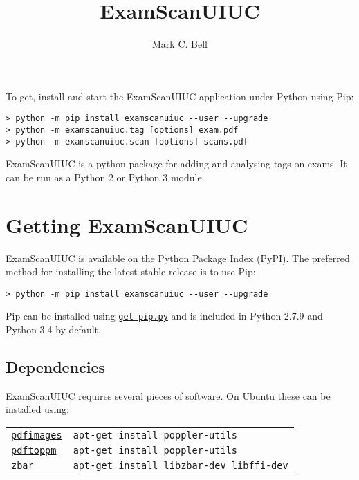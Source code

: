 \documentclass[a4paper]{article}
\title{ExamScanUIUC}
\author{Mark C. Bell}
\begin{document}
\maketitle

\begin{center}
\begin{minipage}{0.9\linewidth}
\begin{framed}
To get, install and start the ExamScanUIUC application under Python using Pip:
\begin{lstlisting}
> python -m pip install examscanuiuc --user --upgrade
> python -m examscanuiuc.tag [options] exam.pdf
> python -m examscanuiuc.scan [options] scans.pdf
\end{lstlisting}
\end{framed}
\end{minipage}
\end{center}

ExamScanUIUC is a python package for adding and analysing tags on exams.
It can be run as a Python 2 or Python 3 module.

\section{Getting ExamScanUIUC}

ExamScanUIUC is available on the Python Package Index (PyPI). The preferred method for installing the latest stable release is to use Pip:
\begin{lstlisting}
> python -m pip install examscanuiuc --user --upgrade
\end{lstlisting}
Pip can be installed using \href{http://pip.readthedocs.org/en/latest/installing.html}{\texttt{get-pip.py}} and is included in Python 2.7.9 and Python 3.4 by default.

\subsection{Dependencies}

ExamScanUIUC requires several pieces of software. On Ubuntu these can be installed using:

\begin{tabular}{ll}
\href{https://poppler.freedesktop.org/}{\texttt{pdfimages}} & \texttt{apt-get install poppler-utils} \\
\href{https://poppler.freedesktop.org/}{\texttt{pdftoppm}} &  \texttt{apt-get install poppler-utils} \\
\href{http://zbar.sourceforge.net/}{\texttt{zbar}} & \texttt{apt-get install libzbar-dev libffi-dev}
\end{tabular}
\end{document}

